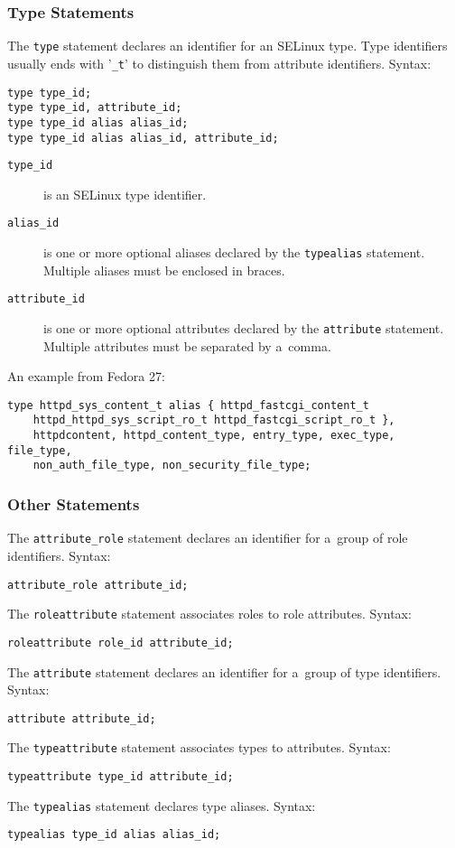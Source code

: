 \subsubsection{Type Statements}
The \texttt{type} statement declares an identifier for an SELinux type. Type
identifiers usually ends with '\texttt{\_t}' to distinguish them from attribute
identifiers. Syntax:
\begin{lstlisting}[language=te]
type type_id;
type type_id, attribute_id;
type type_id alias alias_id;
type type_id alias alias_id, attribute_id;
\end{lstlisting}
\begin{description}
    \item [\texttt{type\_id}] is an SELinux type identifier.
    \item [\texttt{alias\_id}] is one or more optional aliases declared by the
        \texttt{typealias} statement. Multiple aliases must be enclosed in
        braces.
    \item [\texttt{attribute\_id}] is one or more optional attributes declared
        by the \texttt{attribute} statement. Multiple attributes must be
        separated by a~comma.
\end{description}
An example from Fedora 27:
\begin{lstlisting}[language=te]
type httpd_sys_content_t alias { httpd_fastcgi_content_t
    httpd_httpd_sys_script_ro_t httpd_fastcgi_script_ro_t },
    httpdcontent, httpd_content_type, entry_type, exec_type, file_type,
    non_auth_file_type, non_security_file_type;
\end{lstlisting}

\subsubsection{Other Statements}
The \texttt{attribute\_role} statement declares an identifier for a~group of
role identifiers. Syntax:
\begin{lstlisting}[language=te]
attribute_role attribute_id;
\end{lstlisting}
The \texttt{roleattribute} statement associates roles to role attributes.
Syntax:
\begin{lstlisting}[language=te]
roleattribute role_id attribute_id;
\end{lstlisting}
The \texttt{attribute} statement declares an identifier for a~group of type
identifiers. Syntax:
\begin{lstlisting}[language=te]
attribute attribute_id;
\end{lstlisting}
The \texttt{typeattribute} statement associates types to attributes. Syntax:
\begin{lstlisting}[language=te]
typeattribute type_id attribute_id;
\end{lstlisting}
The \texttt{typealias} statement declares type aliases. Syntax:
\begin{lstlisting}[language=te]
typealias type_id alias alias_id;
\end{lstlisting}

